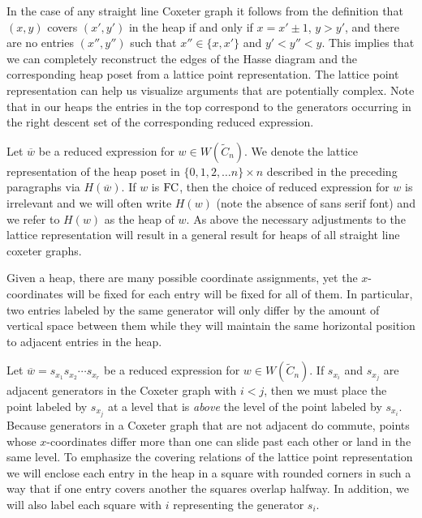 In the case of any straight line Coxeter graph it follows from the definition that $(x,y)$ covers $(x',y')$ in the heap if and only if $x = x' \pm 1$, $y > y'$, and there are no entries $(x'', y'')$ such that $x'' \in \{x, x'\}$ and $y'< y'' < y$. This implies that we can completely reconstruct the edges of the Hasse diagram and the corresponding heap poset from a lattice point representation. The lattice point representation can help us visualize arguments that are potentially complex. Note that in our heaps the entries in the top correspond to the generators occurring in the right descent set of the corresponding reduced expression.

Let $\overline{w}$ be a reduced expression for $w \in W(\widetilde{C}_n)$. We denote the lattice representation of the heap poset in $\{0,1,2, \ldots n\} \times n$ described in the preceding paragraphs via $H(\overline{w})$. If $w$ is $\mathrm{FC}$, then the choice of reduced expression for $w$ is irrelevant and we will often write $H(w)$ (note the absence of \textsf{sans serif} font) and we refer to $H(w)$ as the heap of $w$. As above the necessary adjustments to the lattice representation will result in a general result for heaps of all straight line coxeter graphs.

Given a heap, there are many possible coordinate assignments, yet the $x$-coordinates will be fixed for each entry will be fixed for all of them. In particular, two entries labeled by the same generator will only differ by the amount of vertical space between them while they will maintain the same horizontal position to adjacent entries in the heap.

Let $\overline{w}=s_{x_1}s_{x_2}\cdots s_{x_r}$ be a reduced expression for $w \in W(\widetilde{C}_n)$. If $s_{x_i}$ and $s_{x_j}$ are adjacent generators in the Coxeter graph with $i<j$, then we must place the point labeled by $s_{x_j}$ at a level that is \emph{above} the level of the point labeled by $s_{x_i}$. Because generators in a Coxeter graph that are not adjacent do commute, points whose $x$-coordinates differ more than one can slide past each other or land in the same level. To emphasize the covering relations of the lattice point representation we will enclose each entry in the heap in a square with rounded corners in such a way that if one entry covers another the squares overlap halfway. In addition, we will also label each square with $i$ representing the generator $s_i$.

